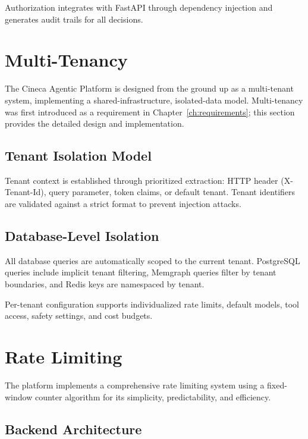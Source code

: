 \documentclass[a4paper,twoside]{sapthesis}
\begin{document}
Authorization integrates with FastAPI through dependency injection and generates audit trails for all decisions.

\section{Multi-Tenancy}
\label{sec:multi-tenancy}

The Cineca Agentic Platform is designed from the ground up as a multi-tenant system, implementing a shared-infrastructure, isolated-data model. Multi-tenancy was first introduced as a requirement in Chapter~\ref{ch:requirements}; this section provides the detailed design and implementation.

\subsection{Tenant Isolation Model}
\label{subsec:tenant-isolation-model}

Tenant context is established through prioritized extraction: HTTP header (X-Tenant-Id), query parameter, token claims, or default tenant. Tenant identifiers are validated against a strict format to prevent injection attacks.

\subsection{Database-Level Isolation}
\label{subsec:db-isolation}

All database queries are automatically scoped to the current tenant. PostgreSQL queries include implicit tenant filtering, Memgraph queries filter by tenant boundaries, and Redis keys are namespaced by tenant.

Per-tenant configuration supports individualized rate limits, default models, tool access, safety settings, and cost budgets.

\section{Rate Limiting}
\label{sec:rate-limiting}

The platform implements a comprehensive rate limiting system using a fixed-window counter algorithm for its simplicity, predictability, and efficiency.

\subsection{Backend Architecture}
\label{subsec:rate-limit-backends}
\end{document}
